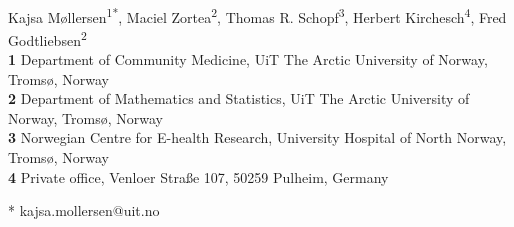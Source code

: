 \documentclass[10pt,letterpaper]{article}
\date{}
\begin{document}
\vspace*{0.2in}

\begin{flushleft}
{\Large
\textbf{} %
}
\newline
\\
Kajsa M{\o}llersen\textsuperscript{1*},
Maciel Zortea\textsuperscript{2},
Thomas R. Schopf\textsuperscript{3},
Herbert Kirchesch\textsuperscript{4},
Fred Godtliebsen\textsuperscript{2}
\\
\bigskip
\textbf{1} Department of Community Medicine, UiT The Arctic University of Norway, Troms{\o}, Norway
\\
\textbf{2} Department of Mathematics and Statistics, UiT The Arctic University of Norway, Troms{\o}, Norway
\\
\textbf{3} Norwegian Centre for E-health Research, University Hospital of North Norway, Troms{\o}, Norway
\\
\textbf{4} Private office, Venloer Stra{\ss}e 107, 50259 Pulheim, Germany
\\
\bigskip

% 
%





* kajsa.mollersen@uit.no

\end{flushleft}
\end{document}
